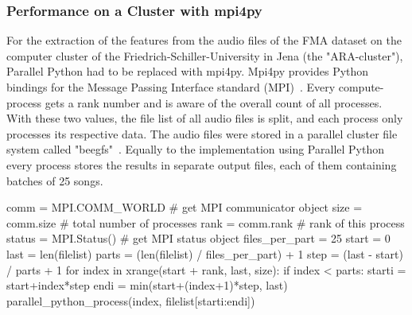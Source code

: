 \subsubsection{Performance on a Cluster with mpi4py}\label{mpi4py}

For the extraction of the features from the audio files of the FMA dataset on the computer cluster of the Friedrich-Schiller-University in Jena (the "ARA-cluster"), Parallel Python had to be replaced with mpi4py. 
Mpi4py provides Python bindings for the Message Passing Interface standard (MPI)~\cite{mpi4py}. 
Every compute-process gets a rank number and is aware of the overall count of all processes. With these two values, the file list of all audio files is split, and each process only processes its respective data. The audio files were stored in a parallel cluster file system called "beegfs"~\cite{beegfs}. Equally to the implementation using Parallel Python every process stores the results in separate output files, each of them containing batches of 25 songs.\\

\begin{pythonCode}[frame=single,label={lst:mpi4py},caption={Mpi4py},captionpos=b]
comm = MPI.COMM_WORLD   # get MPI communicator object
size = comm.size        # total number of processes
rank = comm.rank        # rank of this process
status = MPI.Status()   # get MPI status object
files_per_part = 25
start = 0
last = len(filelist)
parts = (len(filelist) / files_per_part) + 1
step = (last - start) / parts + 1
for index in xrange(start + rank, last, size):
    if index < parts:        
        starti = start+index*step
        endi = min(start+(index+1)*step, last)
        parallel_python_process(index, filelist[starti:endi])
\end{pythonCode}

